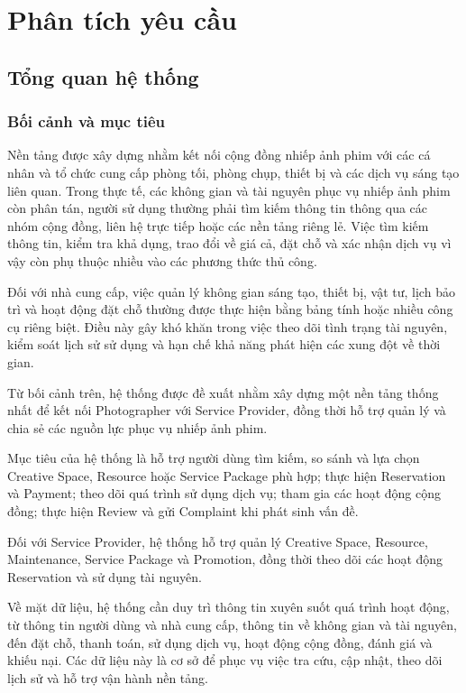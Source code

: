 \chapter{Phân tích yêu cầu}

\section{Tổng quan hệ thống}
\subsection{Bối cảnh và mục tiêu}
Nền tảng được xây dựng nhằm kết nối cộng đồng nhiếp ảnh phim với các cá nhân và tổ chức cung cấp phòng tối, phòng chụp, thiết bị và các dịch vụ sáng tạo liên quan. Trong thực tế, các không gian và tài nguyên phục vụ nhiếp ảnh phim còn phân tán, người sử dụng thường phải tìm kiếm thông tin thông qua các nhóm cộng đồng, liên hệ trực tiếp hoặc các nền tảng riêng lẻ. Việc tìm kiếm thông tin, kiểm tra khả dụng, trao đổi về giá cả, đặt chỗ và xác nhận dịch vụ vì vậy còn phụ thuộc nhiều vào các phương thức thủ công.

Đối với nhà cung cấp, việc quản lý không gian sáng tạo, thiết bị, vật tư, lịch bảo trì và hoạt động đặt chỗ thường được thực hiện bằng bảng tính hoặc nhiều công cụ riêng biệt. Điều này gây khó khăn trong việc theo dõi tình trạng tài nguyên, kiểm soát lịch sử sử dụng và hạn chế khả năng phát hiện các xung đột về thời gian.

Từ bối cảnh trên, hệ thống được đề xuất nhằm xây dựng một nền tảng thống nhất để kết nối Photographer với Service Provider, đồng thời hỗ trợ quản lý và chia sẻ các nguồn lực phục vụ nhiếp ảnh phim.

Mục tiêu của hệ thống là hỗ trợ người dùng tìm kiếm, so sánh và lựa chọn Creative Space, Resource hoặc Service Package phù hợp; thực hiện Reservation và Payment; theo dõi quá trình sử dụng dịch vụ; tham gia các hoạt động cộng đồng; thực hiện Review và gửi Complaint khi phát sinh vấn đề.

Đối với Service Provider, hệ thống hỗ trợ quản lý Creative Space, Resource, Maintenance, Service Package và Promotion, đồng thời theo dõi các hoạt động Reservation và sử dụng tài nguyên.

Về mặt dữ liệu, hệ thống cần duy trì thông tin xuyên suốt quá trình hoạt động, từ thông tin người dùng và nhà cung cấp, thông tin về không gian và tài nguyên, đến đặt chỗ, thanh toán, sử dụng dịch vụ, hoạt động cộng đồng, đánh giá và khiếu nại. Các dữ liệu này là cơ sở để phục vụ việc tra cứu, cập nhật, theo dõi lịch sử và hỗ trợ vận hành nền tảng.
